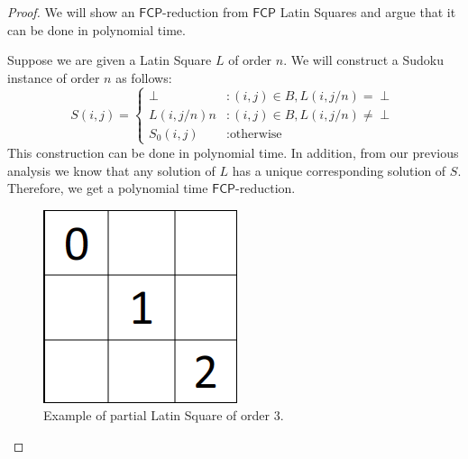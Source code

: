 \documentclass[runningheads,a4paper]{llncs}
\begin{document}
\begin{proof} 

We will show an $\mathsf{FCP}$-reduction from $\mathsf{FCP}$ Latin Squares and argue that it can be done in polynomial time.

Suppose we are given a Latin Square $L$ of order $n$. We will construct a Sudoku instance of order $n$ as follows:
\begin{displaymath}
S(i,j) = \left\{
\begin{array}{lr}
\perp & : (i,j) \in B, L(i, j/n) = \perp \\
L(i, j/n) n & : (i,j) \in B, L(i, j/n) \neq \perp \\
S_0 (i,j) & : \text{otherwise}
\end{array}
\right.
\end{displaymath}
This construction can be done in polynomial time. In addition, from our previous analysis we know that any solution of $L$ has a unique corresponding solution of $S$. Therefore, we get a polynomial time $\mathsf{FCP}$-reduction.

\begin{figure}[H]
\label{fig:partialLS}
\centering
\includegraphics[scale=0.25]{sudoku-3.png}
\caption{Example of partial Latin Square of order 3.}
\end{figure}


\end{proof}
\end{document}
